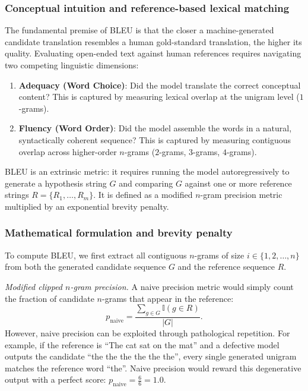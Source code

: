\documentclass[../../../main.tex]{subfiles}
\begin{document}
\subsubsection{Conceptual intuition and reference-based lexical matching}
The fundamental premise of BLEU is that the closer a machine-generated candidate translation resembles a human gold-standard translation, the higher its quality. Evaluating open-ended text against human references requires navigating two competing linguistic dimensions:
\begin{enumerate}
    \item \textbf{Adequacy (Word Choice)}: Did the model translate the correct conceptual content? This is captured by measuring lexical overlap at the unigram level ($1$-grams).
    \item \textbf{Fluency (Word Order)}: Did the model assemble the words in a natural, syntactically coherent sequence? This is captured by measuring contiguous overlap across higher-order $n$-grams ($2$-grams, $3$-grams, $4$-grams).
\end{enumerate}

BLEU is an extrinsic metric: it requires running the model autoregressively to generate a hypothesis string $G$ and comparing $G$ against one or more reference strings $R = \{R_1, \dots, R_m\}$. It is defined as a modified $n$-gram precision metric multiplied by an exponential brevity penalty.

\subsubsection{Mathematical formulation and brevity penalty}
To compute BLEU, we first extract all contiguous $n$-grams of size $i \in \{1, 2, \dots, n\}$ from both the generated candidate sequence $G$ and the reference sequence $R$.

\textit{Modified clipped $n$-gram precision.} A naive precision metric would simply count the fraction of candidate $n$-grams that appear in the reference:
\begin{equation*}
p_{\text{naive}} = \frac{\sum_{g \in G} \mathbb{I}(g \in R)}{|G|}.
\end{equation*}
However, naive precision can be exploited through pathological repetition. For example, if the reference is ``The cat sat on the mat'' and a defective model outputs the candidate ``the the the the the the'', every single generated unigram matches the reference word ``the''. Naive precision would reward this degenerative output with a perfect score: $p_{\text{naive}} = \frac{6}{6} = 1.0$.
\end{document}
